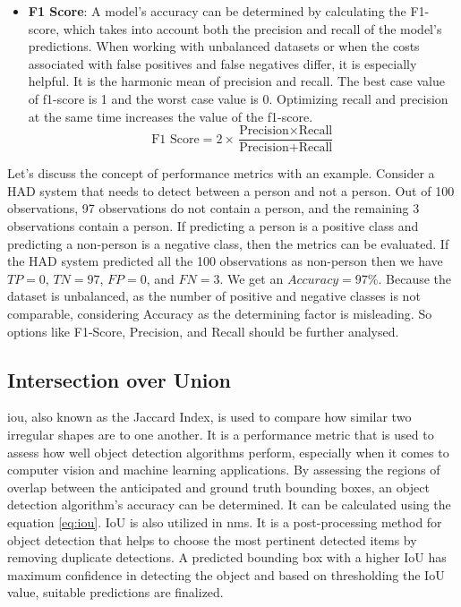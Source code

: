 \begin{itemize}
    \item \textbf{F1 Score}: A model's accuracy can be determined by calculating the F1-score, which takes into account both the precision and recall of the model's predictions. When working with unbalanced datasets or when the costs associated with false positives and false negatives differ, it is especially helpful. It is the harmonic mean of precision and recall. The best case value of f1-score is 1 and the worst case value is 0. Optimizing recall and precision at the same time increases the value of the f1-score.
    \begin{equation}
        \text{F1 Score} = 2 \times \frac{\text{Precision} \times \text{Recall}}{\text{Precision} + \text{Recall}}
    \end{equation}
\end{itemize}


Let's discuss the concept of performance metrics with an example. Consider a HAD system that needs to detect between a person and not a person. Out of 100 observations, 97 observations do not contain a person, and the remaining 3 observations contain a person. If predicting a person is a positive class and predicting a non-person is a negative class, then the metrics can be evaluated. If the HAD system predicted all the 100 observations as non-person then we have \(TP = 0\), \(TN = 97\), \(FP = 0\), and \(FN = 3\). We get an \(Accuracy = 97\%\). Because the dataset is unbalanced, as the number of positive and negative classes is not comparable, considering Accuracy as the determining factor is misleading. So options like F1-Score, Precision, and Recall should be further analysed.

\subsection{Intersection over Union}
\acrfull{iou}, also known as the Jaccard Index, is used to compare how similar two irregular shapes are to one another. It is a performance metric that is used to assess how well object detection algorithms perform, especially when it comes to computer vision and machine learning applications. By assessing the regions of overlap between the anticipated and ground truth bounding boxes, an object detection algorithm's accuracy can be determined. It can be calculated using the equation \ref{eq:iou}. IoU is also utilized in \acrfull{nms}. It is a post-processing method for object detection that helps to choose the most pertinent detected items by removing duplicate detections. A predicted bounding box with a higher IoU has maximum confidence in detecting the object and based on thresholding the IoU value, suitable predictions are finalized.


